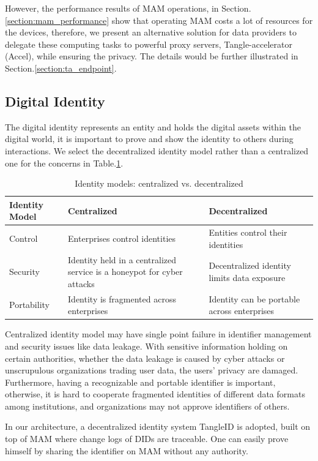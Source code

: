 \documentclass[conference]{IEEEtran}
\begin{document}
However, the performance results of MAM operations, in Section.\ref{section:mam_performance} show that operating MAM costs a lot of resources for the devices, therefore, we present an alternative solution for data providers to delegate these computing tasks to powerful proxy servers, Tangle-accelerator (Accel)\cite{TA}, while ensuring the privacy. The details would be further illustrated in Section.\ref{section:ta_endpoint}. 

\subsection{Digital Identity}
The digital identity represents an entity and holds the digital assets within the digital world, it is important to prove and show the identity to others during interactions. We select the decentralized identity model rather than a centralized one for the concerns in Table.\ref{tab:did}.
\begin{table}[h]
	\caption{Identity models: centralized vs. decentralized}
	\label{tab:did}
	\begin{tabularx}{\linewidth}{|l|X|X|}
	\hline
		\textbf{Identity Model} & \textbf{Centralized} & \textbf{Decentralized} \\
		\hline
		Control & Enterprises control identities & Entities control their identities \\
		\hline
		Security & Identity held in a centralized service is a honeypot for cyber attacks & Decentralized identity limits data exposure \\
		\hline
		Portability & Identity is fragmented across enterprises & Identity can be portable across enterprises \\
		\hline
	\end{tabularx}
\end{table}

Centralized identity model may have single point failure in identifier management and security issues like data leakage. With sensitive information holding on certain authorities, whether the data leakage is caused by cyber attacks or unscrupulous organizations trading user data, the users' privacy are damaged. Furthermore, having a recognizable and portable identifier is important, otherwise, it is hard to cooperate fragmented identities of different data formats among institutions, and organizations may not approve identifiers of others.

In our architecture, a decentralized identity system TangleID\cite{TangleID} is adopted, built on top of MAM where change logs of DIDs are traceable. One can easily prove himself by sharing the identifier on MAM without any authority.
\end{document}
